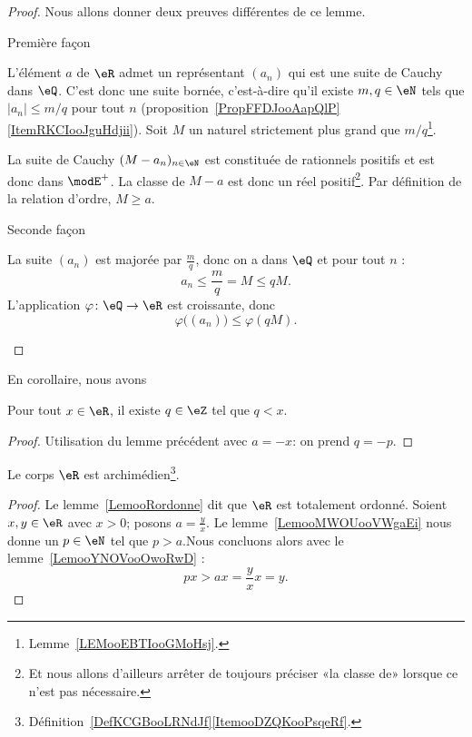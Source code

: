 \begin{proof}
    Nous allons donner deux preuves différentes de ce lemme.
    \begin{subproof}
    \item[Première façon]

        L'élément \( a\) de \( \eR\) admet un représentant \( (a_n)\) qui est une suite de Cauchy dans \( \eQ\). C'est donc une suite bornée, c'est-à-dire qu'il existe \( m,q\in \eN\) tels que \( | a_n |\leq m/q\) pour tout \( n\) (proposition~\ref{PropFFDJooAapQlP}\ref{ItemRKCIooJguHdjii}). Soit \( M\) un naturel strictement plus grand que \( m/q\)\footnote{Lemme~\ref{LEMooEBTIooGMoHsj}.}.

    La suite de Cauchy \( (M-a_n)_{n\in \eN}\) est constituée de rationnels positifs et est donc dans \( \modE^+\). La classe de \( M-a\) est donc un réel positif\footnote{Et nous allons d'ailleurs arrêter de toujours préciser «la classe de» lorsque ce n'est pas nécessaire.}. Par définition de la relation d'ordre, \( M\geq a\).
\item[Seconde façon]

    La suite \( (a_n)\) est majorée par \( \frac{ m }{ q }\), donc on a dans \( \eQ\) et pour tout \( n\) :
    \begin{equation}
        a_n\leq \frac{ m }{ q }=M\leq qM.
    \end{equation}
    L'application \( \varphi\colon \eQ\to \eR\) est croissante, donc
    \begin{equation}
        \varphi\big( (a_n) \big)\leq \varphi(qM).
    \end{equation}
    \end{subproof}
\end{proof}

En corollaire, nous avons
\begin{lemma}      \label{LEMooMWOUooVWgbFi}
    Pour tout \( x\in \eR\), il existe \( q\in \eZ\) tel que \( q < x\).
\end{lemma}
\begin{proof}
    Utilisation du lemme précédent avec \( a = -x \): on prend \( q = -p \).
\end{proof}

\begin{theorem}        \label{ThoooKJTTooCaxEny}
    Le corps \( \eR\) est archimédien\footnote{Définition~\ref{DefKCGBooLRNdJf}\ref{ItemooDZQKooPsqeRf}.}.
\end{theorem}

\begin{proof}
    Le lemme~\ref{LemooRordonne} dit que \( \eR\) est totalement ordonné. Soient \( x,y\in \eR\) avec \( x>0\); posons \( a=\frac{ y }{ x }\). Le lemme~\ref{LemooMWOUooVWgaEi} nous donne un \( p \in \eN\) tel que \(p > a\).Nous concluons alors avec le lemme~\ref{LemooYNOVooOwoRwD} :
    \begin{equation}
        px>ax=\frac{ y }{ x }x=y.
    \end{equation}
\end{proof}

